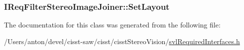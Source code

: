 \subsubsection[{Set\+Layout}]{ I\+Req\+Filter\+Stereo\+Image\+Joiner\+::\+Set\+Layout}\label{class_i_req_filter_stereo_image_joiner_a5e2f7bb1b492d0001721ae8dea1348b7}


The documentation for this class was generated from the following file\+:\begin{DoxyCompactItemize}
\item 
/\+Users/anton/devel/cisst-\/saw/cisst/cisst\+Stereo\+Vision/\hyperlink{svl_required_interfaces_8h}{svl\+Required\+Interfaces.\+h}\end{DoxyCompactItemize}
